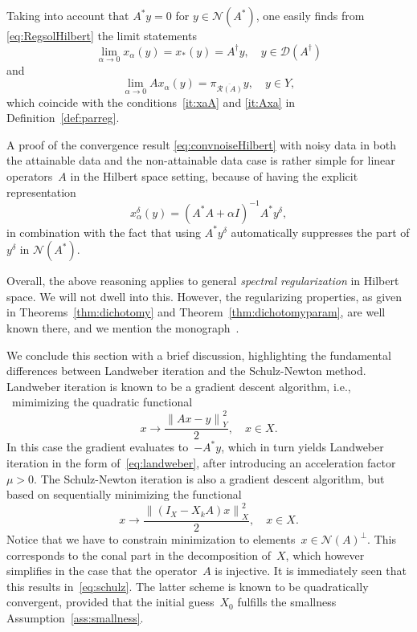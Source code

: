 \documentclass[12pt]{amsart}
\newcommand{\norm}[2]{\left\|#1\right\|_{#2}}
\newcommand{\lr}[1]{\left(#1\right)}
\newcommand{\domain}{\mathcal D}
\newcommand{\range}{\mathcal R}
\newcommand{\N}{\mathcal N}
\theoremstyle{remark}
\begin{document}
Taking into account that $A^*y=0$ for $y \in \N(A^*)$,
one easily finds from \eqref{eq:RegsolHilbert} the limit statements
$$ \lim_{\alpha \to 0} x_\alpha(y) = x_*(y)=A^\dagger y, \quad y \in \domain(A^\dagger)$$
and
$$ \lim_{\alpha \to 0} A x_\alpha(y) = \pi_{\overline{\range(A)}}y, \quad y \in Y, $$
which coincide with the conditions~\eqref{it:xaA} and \eqref{it:Axa} in Definition~\ref{def:parreg}.

A proof of the convergence result \eqref{eq:convnoiseHilbert} with noisy data in both the attainable data and the non-attainable data case is rather simple for linear operators~$A$ in the Hilbert space setting, because of having the explicit representation~
$$x^\delta_\alpha(y)=(A^*A+\alpha I)^{-1}A^*y^\delta,$$
in combination with the fact that using $A^*y^\delta$ automatically suppresses the part of $y^\delta$ in $\N(A^*)$.
\smallskip

Overall, the above reasoning applies to general \emph{spectral regularization} in Hilbert space. We will not dwell into this. However, the regularizing properties, as given in Theorems~\ref{thm:dichotomy} and Theorem~\ref{thm:dichotomyparam}, are well known there, and we mention the monograph~\cite[Thm.~5.2]{MR859375}.

\smallskip

We conclude this section with a brief discussion, highlighting the fundamental differences between Landweber iteration and the Schulz-Newton method.  Landweber iteration is known to be a gradient descent algorithm, i.e., \ mimimizing the quadratic functional
$$
x \longrightarrow \frac{\norm{A x - y}{Y}^2}{2},\quad x\in X.
$$
In this case the gradient evaluates to~$- A^\ast y$, which in turn yields Landweber iteration in the form of~\eqref{eq:landweber}, after introducing an acceleration factor~$\mu>0$.
The Schulz-Newton iteration is also a gradient descent algorithm, but based on sequentially minimizing the functional
$$
 x \longrightarrow \frac{\norm{ \lr{ I_X- X_k A} x}{X}^2}{2}, \quad x\in X.
$$
Notice that we have to constrain minimization to elements~$x \in \N(A)^\perp$. This corresponds to the conal part in the decomposition of~$X$, which however simplifies in the case that the operator~$A$ is injective.
It is immediately seen that this results in~\eqref{eq:schulz}. The latter scheme is known to be quadratically convergent, provided that the initial guess~$X_0$ fulfills the smallness Assumption~\ref{ass:smallness}.
\end{document}
